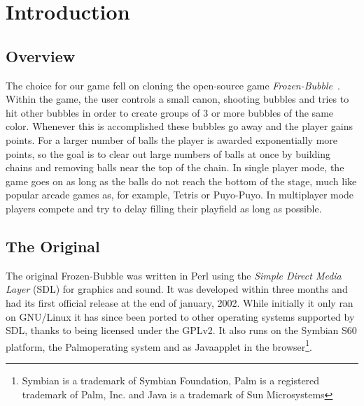 \section{Introduction}
\subsection{Overview}
%
The choice for our game fell on cloning the open-source game \emph{Frozen-Bubble}~\cite{website:frozenbubble}. 
%
%
Within the game, the user controls a small canon, shooting bubbles and tries to 
hit other bubbles in order to create groups of 3 or more bubbles of the same color. 
Whenever this is accomplished these bubbles go away and the player gains points. 
For a larger number of balls the 
player is awarded exponentially more points, so the goal is to clear out large numbers 
of balls at once by building chains and removing balls near the top of the chain.
In single player mode, the game goes on as long as the balls do not reach the bottom 
of the stage, much like popular arcade games as, for example, Tetris or Puyo-Puyo.
In multiplayer mode players compete and try to delay filling their playfield 
as long as possible.
%
\subsection{The Original}
The original Frozen-Bubble was written in Perl using the \emph{Simple Direct Media Layer} (SDL)
for graphics and sound. It was developed within three months and had its first official 
release at the end of january, 2002. While initially it only ran on GNU/Linux it has since
been ported to other operating systems supported by SDL, thanks to being licensed under the GPLv2.
It also runs on the Symbian\trademark
S60 platform, the Palm\registered operating system and as Java\trademark applet in the 
browser\footnote{Symbian is a trademark of Symbian Foundation, Palm is a registered trademark 
of Palm, Inc. and Java is a trademark of Sun Microsystems}. 

